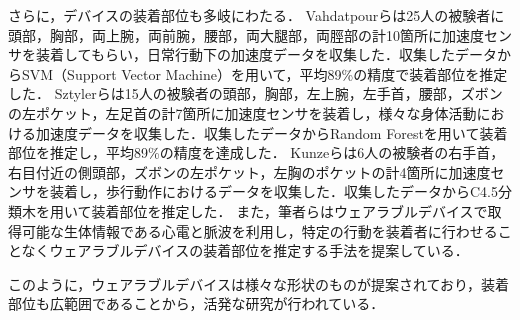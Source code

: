 \documentclass[Japanese,noauthor]{dicomopapers}
\begin{document}
さらに，デバイスの装着部位も多岐にわたる．
Vahdatpourら\cite{localization_vahdatpour}は25人の被験者に頭部，胸部，両上腕，両前腕，腰部，両大腿部，両脛部の計10箇所に加速度センサを装着してもらい，日常行動下の加速度データを収集した．収集したデータからSVM（Support Vector Machine）を用いて，平均89\%の精度で装着部位を推定した．
Sztylerら\cite{localization_sztyler}は15人の被験者の頭部，胸部，左上腕，左手首，腰部，ズボンの左ポケット，左足首の計7箇所に加速度センサを装着し，様々な身体活動における加速度データを収集した．収集したデータからRandom Forestを用いて装着部位を推定し，平均89\%の精度を達成した．
Kunzeら\cite{localization_kunze}は6人の被験者の右手首，右目付近の側頭部，ズボンの左ポケット，左胸のポケットの計4箇所に加速度センサを装着し，歩行動作におけるデータを収集した．収集したデータからC4.5分類木を用いて装着部位を推定した．
また，筆者ら\cite{localization_yoshida}はウェアラブルデバイスで取得可能な生体情報である心電と脈波を利用し，特定の行動を装着者に行わせることなくウェアラブルデバイスの装着部位を推定する手法を提案している．\par

このように，ウェアラブルデバイスは様々な形状のものが提案されており，装着部位も広範囲であることから，活発な研究が行われている．
\end{document}
